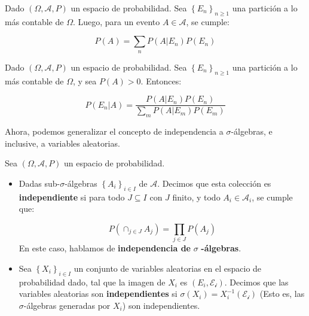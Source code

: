 \begin{theorem}
	Dado $(\Omega, \mathcal{A}, P)$ un espacio de probabilidad. Sea $\left\{ E_n \right\}_{n \geq 1}$ una partición a lo más contable de $\Omega$. Luego, para un evento $A \in \mathcal{A}$, se cumple:

	\[
		P(A) = \sum_{n} P(A \vert E_n) P(E_n)
	\]

\end{theorem}

\begin{theorem}
	Dado $(\Omega, \mathcal{A}, P)$ un espacio de probabilidad. Sea $\left\{ E_n \right\}_{n \geq 1}$ una partición a lo más contable de $\Omega$, y sea $P(A) > 0$. Entonces:

	\[
		P(E_n \vert A) = \frac{ P(A \vert E_n) P(E_n) }{\sum_m P(A \vert E_m)P(E_m)}
	\]

\end{theorem}

Ahora, podemos generalizar el concepto de independencia a $\sigma$-álgebras, e inclusive, a variables aleatorias.

\begin{boxDef}
	Sea $(\Omega, \mathcal{A}, P)$ un espacio de probabilidad.
	\begin{itemize}
		\item Dadas sub-$\sigma$-álgebras $\left\{ A_i \right\}_{i \in I}$ de $\mathcal{A}$. Decimos que esta colección es \textbf{independiente} si para todo $J \subseteq I$ con $J$ finito, y todo $A_i \in \mathcal{A}_i$, se cumple que:

		\[
			P\left( \cap_{j \in J} A_j \right) = \prod_{j \in J} P(A_j)	
		\]
		En este caso, hablamos de \textbf{independencia de } $\sigma$ \textbf{-álgebras}. 

		\item Sea $\left\{ X_i \right\}_{i \in I}$ un conjunto de variables aleatorias en el espacio de probabilidad dado, tal que la imagen de $X_i$ es $(E_i, \mathcal{E_i})$. Decimos que las variables aleatorias son \textbf{independientes} si $\sigma (X_i) = X_i^{-1}(\mathcal{E_i})$ (Esto es, las $\sigma$-álgebras generadas por $X_i$) son independientes.
	\end{itemize}

\end{boxDef}




